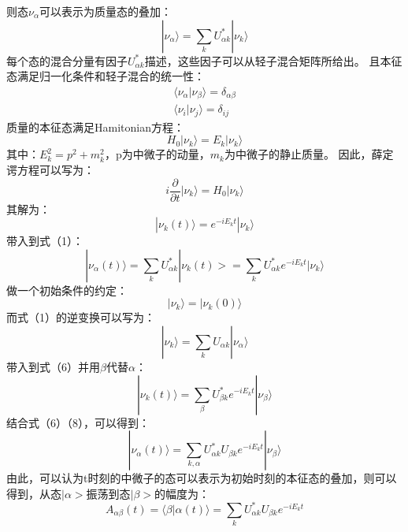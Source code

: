 \documentclass[10pt,a4paper]{article}
\begin{document}
则态$\nu_{\alpha}$可以表示为质量态的叠加：
\begin{equation}
|\nu_{\alpha}\rangle=\sum_{k}U_{\alpha k}^{*}|\nu_{k}\rangle
\end{equation}
每个态的混合分量有因子$U_{\alpha k}^{*}$描述，这些因子可以从轻子混合矩阵所给出。
且本征态满足归一化条件和轻子混合的统一性：
\begin{equation}
\begin{split}
\langle \nu_{\alpha}|\nu_{\beta}\rangle=\delta_{\alpha\beta}\\
\langle\nu_{i}|\nu_{j}\rangle=\delta_{ij}
\end{split}
\end{equation}
质量的本征态满足Hamitonian方程：
\begin{equation}
H_{0}|\nu_{k}\rangle=E_{k}|\nu_{k}\rangle
\end{equation}
其中：$E_{k}^2=p^2+m_{k}^2$，p为中微子的动量，$m_{k}$为中微子的静止质量。
因此，薛定谔方程可以写为：
\begin{equation}
i\frac{\partial}{\partial t}|\nu_{k}\rangle=H_{0}|\nu_{k}\rangle
\end{equation}
其解为：
\begin{equation}
|\nu_{k}(t)\rangle=e^{-iE_{k}t}|\nu_{k}\rangle
\end{equation}
带入到式（1）：
\begin{equation}
|\nu_{\alpha}(t)\rangle=\sum_{k}U_{\alpha k}^{*}|\nu_{k}(t)>=\sum_{k}U_{\alpha k}^{*}e^{-iE_{k}t}|\nu_{k}\rangle
\end{equation}
做一个初始条件的约定：
\[|\nu_{k}\rangle=|\nu_{k}(0)\rangle\]
而式（1）的逆变换可以写为：
\begin{equation}
|\nu_{k}\rangle=\sum_{k}U_{\alpha k}|\nu_{\alpha}\rangle
\end{equation}
带入到式（6）并用$\beta$代替$\alpha$：
\begin{equation}
|\nu_{k}(t)\rangle=\sum_{\beta}U_{\beta k}^{*}e^{-iE_{k}t}|\nu_{\beta}\rangle
\end{equation}
结合式（6）（8），可以得到：
\begin{equation}
|\nu_{\alpha}(t)\rangle=\sum_{k,\alpha}U_{\alpha k}^{*}U_{\beta k}e^{-iE_{k}t}|\nu_{\beta}\rangle
\end{equation}
由此，可以认为t时刻的中微子的态可以表示为初始时刻的本征态的叠加，则可以得到，从态$|\alpha>$振荡到态$|\beta>$的幅度为：
\begin{equation}
A_{\alpha\beta}(t)=\langle\beta|\alpha(t)\rangle=\sum_{k}U_{\alpha k}^{*}U_{\beta k}e^{-iE_{k}t}
\end{equation}
\end{document}
